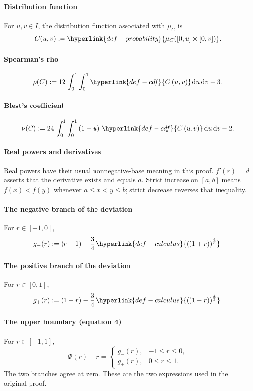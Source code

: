 \documentclass[11pt]{article}
\begin{document}
\hypertarget{def-cdf}{}\paragraph{Distribution function}
For $u,v\in I$, the distribution function associated with $\mu_C$ is
\[C(u,v):=\hyperlink{def-probability}{\mu_{C}([0,u]\times[0,v])}.\]

\hypertarget{def-rho}{}\paragraph{Spearman's rho}
\[\rho(C):=12\,\int_0^1 \int_0^1 \hyperlink{def-cdf}{C\left(u,v\right)}\,\mathrm{d}u\,\mathrm{d}v - 3.\]

\hypertarget{def-nu}{}\paragraph{Blest's coefficient}
\[\nu(C):=24\,\int_0^1 \int_0^1 \left(1 - u\right)\,\hyperlink{def-cdf}{C\left(u,v\right)}\,\mathrm{d}u\,\mathrm{d}v - 2.\]

\hypertarget{def-calculus}{}\paragraph{Real powers and derivatives}
Real powers have their usual nonnegative-base meaning in this proof. $f'(r)=d$ asserts that the derivative exists and equals $d$. Strict increase on $[a,b]$ means $f(x)<f(y)$ whenever $a\le x<y\le b$; strict decrease reverses that inequality.

\hypertarget{def-left-branch}{}\paragraph{The negative branch of the deviation}
For $r\in[-1,0]$,\[g_-(r):=\left(r + 1\right) - \frac{3}{4}\,\hyperlink{def-calculus}{\left(\left(1 + r\right)\right)^{\frac{4}{3}}}.\]

\hypertarget{def-right-branch}{}\paragraph{The positive branch of the deviation}
For $r\in[0,1]$,\[g_+(r):=\left(1 - r\right) - \frac{3}{4}\,\hyperlink{def-calculus}{\left(\left(1 - r\right)\right)^{\frac{4}{3}}}.\]

\hypertarget{def-phi}{}\paragraph{The upper boundary (equation 4)}
For $r\in[-1,1]$,\[\Phi(r)-r=\begin{cases}g_-(r),&-1\le r\le0,\\g_+(r),&0\le r\le1.\end{cases}\] The two branches agree at zero. These are the two expressions used in the original proof.
\end{document}
